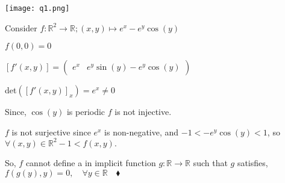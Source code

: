 \documentclass{article}
\newcommand\R{\mathbb{R}}
\begin{document}
\texttt{[image: q1.png]}


Consider $f:\R^2\rightarrow\R;(x,y)\mapsto e^x-e^y\cos(y)$

$f(0,0) = 0$

$[f'(x,y)]  = \begin{pmatrix} e^x & e^y\sin(y) -e^y\cos(y)\end{pmatrix}$

det$([f'(x,y)]_{x})  = e^x \neq 0 $


Since, $\cos(y)$ is periodic $f$ is not injective.

$f$ is not surjective since $e^x$ is non-negative, and $-1
<-e^y\cos(y)< 1$, so $\forall (x,y)\in \R^2 -1<f(x,y).$

So, $f$ cannot
define a in implicit function $g:\R\rightarrow \R$ such that $g$ satisfies,
$f(g(y),y) = 0,\quad \forall y\in \R\quad \blacklozenge$
\end{document}
